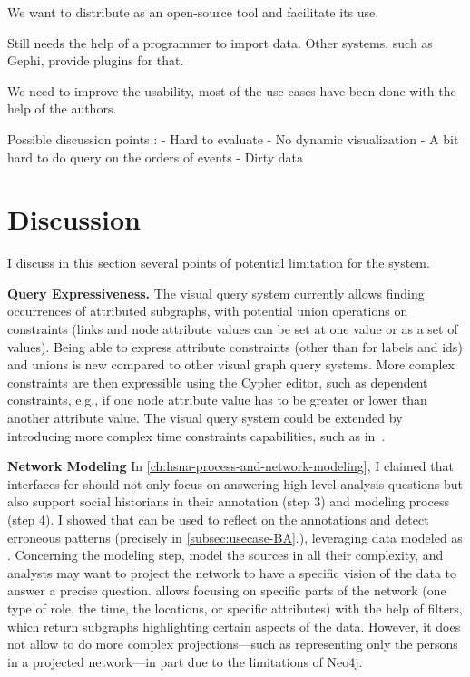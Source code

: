 We want to distribute \name as an open-source tool and facilitate its use.

Still needs the help of a programmer to import data. Other systems, such as Gephi, provide plugins for that.

 We need to improve the usability, most of the use cases have been done with the help of the authors.


Possible discussion points :
- Hard to evaluate
- No dynamic visualization
- A bit hard to do query on the orders of events
- Dirty data
\fi

\section{Discussion}

I discuss in this section several points of potential limitation for the system.

\noindent\textbf{Query Expressiveness.}
The visual query system currently allows finding occurrences of attributed subgraphs, with potential union operations on constraints (links and node attribute values can be set at one value or as a set of values). Being able to express attribute constraints (other than for labels and ids) and unions is new compared to other visual graph query systems.
More complex constraints are then expressible using the Cypher editor, such as dependent constraints, e.g., if one node attribute value has to be greater or lower than another attribute value.
The visual query system could be extended by introducing more complex time constraints capabilities, such as in~\cite{monroe2012exploring}.

\noindent\textbf{Network Modeling}
In \autoref{ch:hsna-process-and-network-modeling}, I claimed that \va interfaces for \hsna should not only focus on answering high-level analysis questions but also support social historians in their annotation (step 3) and modeling process (step 4).
I showed that \combinet can be used to reflect on the annotations and detect erroneous patterns (precisely in \autoref{subsec:usecase-BA}.), leveraging data modeled as \modelplural.
Concerning the modeling step, \modelplural model the sources in all their complexity, and analysts may want to project the network to have a specific vision of the data to answer a precise question.
\combinet allows focusing on specific parts of the network (one type of role, the time, the locations, or specific attributes) with the help of filters, which return subgraphs highlighting certain aspects of the data.
However, it does not allow to do more complex projections---such as representing only the persons in a projected network---in part due to the limitations of Neo4j\cite{neo4j}.


